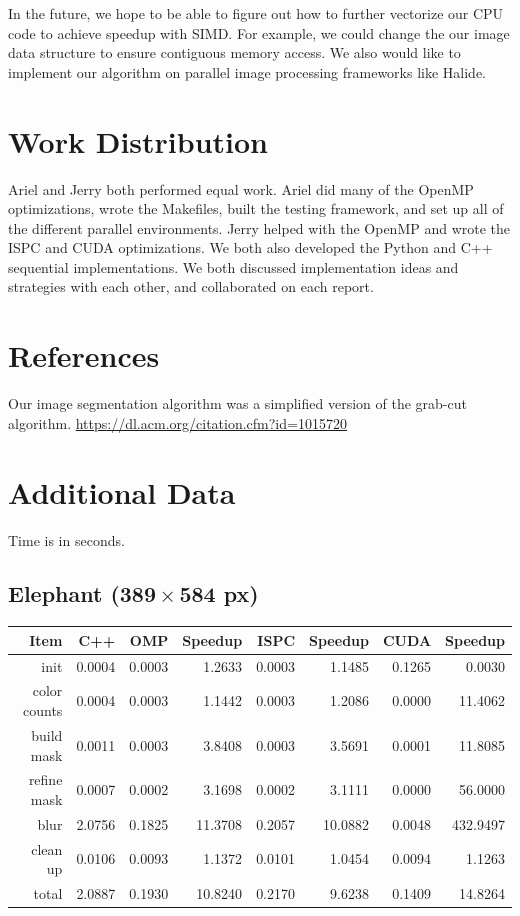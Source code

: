 \documentclass[12pt]{article}
\begin{document}
In the future, we hope to be able to figure out how to further vectorize our
CPU code to achieve speedup with SIMD. For example, we could change the our
image data structure to ensure contiguous memory access. We also would like to
implement our algorithm on parallel image processing frameworks like Halide.

\section{Work Distribution}

Ariel and Jerry both performed equal work. Ariel did many of the OpenMP
optimizations, wrote the Makefiles, built the testing framework, and set up all
of the different parallel environments. Jerry helped with the OpenMP and wrote
the ISPC and CUDA optimizations. We both also developed the Python and C++
sequential implementations. We both discussed implementation ideas and
strategies with each other, and collaborated on each report.

\section{References}

Our image segmentation algorithm was a simplified version of the grab-cut
algorithm. \url{https://dl.acm.org/citation.cfm?id=1015720}

\section{Additional Data}

Time is in seconds. \\
\subsection{Elephant ($\mathbf{389 \times 584}$ px)}

\begin{tabular}{r|r|r|r|r|r|r|r}
    Item & C++ & OMP & Speedup & ISPC & Speedup & CUDA & Speedup
\\  \hline
    init & 0.0004 & 0.0003 & 1.2633 & 0.0003 & 1.1485 & 0.1265 & 0.0030
\\  color counts & 0.0004 & 0.0003 & 1.1442 & 0.0003 & 1.2086 & 0.0000 & 11.4062
\\  build mask & 0.0011 & 0.0003 & 3.8408 & 0.0003 & 3.5691 & 0.0001 & 11.8085
\\  refine mask & 0.0007 & 0.0002 & 3.1698 & 0.0002 & 3.1111 & 0.0000 & 56.0000
\\  blur & 2.0756 & 0.1825 & 11.3708 & 0.2057 & 10.0882 & 0.0048 & 432.9497
\\  clean up & 0.0106 & 0.0093 & 1.1372 & 0.0101 & 1.0454 & 0.0094 & 1.1263
\\  \hline
    total & 2.0887 & 0.1930 & 10.8240 & 0.2170 & 9.6238 & 0.1409 & 14.8264
\end{tabular}
\end{document}
